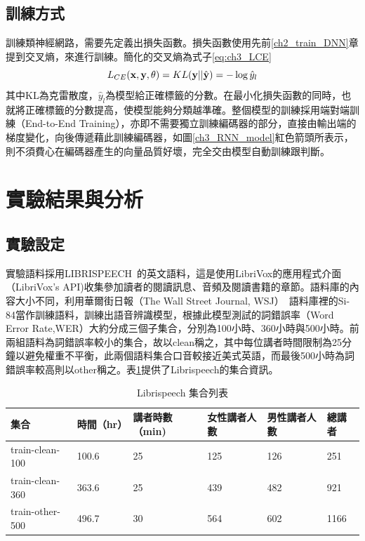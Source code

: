 \subsection{訓練方式}
訓練類神經網路，需要先定義出損失函數。損失函數使用先前\ref{ch2_train_DNN}章提到交叉熵，來進行訓練。簡化的交叉熵為式子\ref{eq:ch3_LCE}
\begin{equation} 
\label{eq:ch3_LCE}
L_{CE}(\bold{x} , \bold{y} , \theta) = KL( \bold{y} ||\hat{\bold {y}} )  = - \log \hat{y}_{l} 
\end{equation}
其中KL為克雷散度，$\hat{y}_{l}$為模型給正確標籤的分數。在最小化損失函數的同時，也就將正確標籤的分數提高，使模型能夠分類越準確。整個模型的訓練採用端對端訓練（End-to-End
Training），亦即不需要獨立訓練編碼器的部分，直接由輸出端的梯度變化，向後傳遞藉此訓練編碼器，如圖\ref{ch3_RNN_model}紅色箭頭所表示，則不須費心在編碼器產生的向量品質好壞，完全交由模型自動訓練跟判斷。
\section{實驗結果與分析}
\subsection{實驗設定}
 實驗語料採用LIBRISPEECH~\cite{panayotov2015librispeech}的英文語料，這是使用LibriVox的應用程式介面（LibriVox's
 API)收集參加讀者的閱讀訊息、音頻及閱讀書籍的章節。語料庫的內容大小不同，利用華爾街日報（The
 Wall Street Journal,
 WSJ）~\cite{paul1992design}語料庫裡的Si-84當作訓練語料，訓練出語音辨識模型，根據此模型測試的詞錯誤率（Word
 Error
 Rate,WER）大約分成三個子集合，分別為100小時、360小時與500小時。前兩組語料為詞錯誤率較小的集合，故以clean稱之，其中每位講者時間限制為25分鐘以避免權重不平衡，此兩個語料集合口音較接近美式英語，而最後500小時為詞錯誤率較高則以other稱之。表\ref{table:ex_info}提供了Librispeech的集合資訊。
 \begin{table}[ht]
	 \caption{Librispeech 集合列表}
	 \label{table:ex_info}
 \begin{tabular}[t]{|l|l|l|l|l|l|}
	 \hline
	 集合 & 時間（hr） & 講者時數（min) &女性講者人數&男性講者人數&總講者\\
	 \hline
	 train-clean-100   & 100.6   & 25 & 125 & 126 & 251 \\
	 \hline
	 train-clean-360   & 363.6   & 25 & 439 & 482 & 921 \\
	 \hline
	 train-other-500   & 496.7   & 30 & 564 & 602 & 1166 \\
	 \hline
 \end{tabular}
 \end{table}
 
